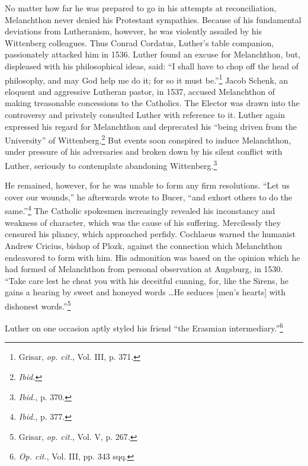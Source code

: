 No matter how far he was prepared to go in his attempts at reconciliation,
Melanchthon never denied his Protestant sympathies.
Because of his fundamental deviations from Lutheranism, however,
he was violently assailed by his Wittenberg colleagues. Thus Conrad
Cordatus, Luther’s table companion, passionately attacked him in
1536. Luther found an excuse for Melanchthon, but, displeased with
his philosophical ideas, said: “I shall have to chop off the head of philosophy,
and may God help me do it; for so it must be.”\footnote{Grisar, \textit{op. cit.}, Vol. III, p. 371.}
 Jacob
Schenk, an eloquent and aggressive Lutheran pastor, in 1537, accused
Melanchthon of making treasonable concessions to the Catholics. The
Elector was drawn into the controversy and privately consulted
Luther with reference to it. Luther again expressed his regard for
Melanchthon and deprecated his “being driven from the University”
of Wittenberg.\footnote{\textit{Ibid.}}
 But events soon conspired to induce Melanchthon,
under pressure of his adversaries and broken down by his silent conflict
with Luther, seriously to contemplate abandoning Wittenberg.\footnote{\textit{Ibid.}, p. 370.}

He remained, however, for he was unable to form any firm resolutions.
“Let us cover our wounds,” he afterwards wrote to Bucer, “and
exhort others to do the same.”\footnote{\textit{Ibid.}, p. 377.}
The Catholic spokesmen increasingly
revealed his inconstancy and weakness of character, which was the
cause of his suffering. Mercilessly they censured his pliancy, which
approached perfidy. Cochlaeus warned the humanist Andrew Cricius,
bishop of Plozk, against the connection which Melanchthon endeavored to
form with him. His admonition was based on the opinion
which he had formed of Melanchthon from personal observation at
Augsburg, in 1530. “Take care lest he cheat you with his deceitful
cunning, for, like the Sirens, he gains a hearing by sweet and honeyed
words \dots He seduces [men’s hearts] with dishonest words.”\footnote{Grisar, \textit{op. cit.}, Vol. V, p. 267.}

Luther on one occasion aptly styled his friend “the Erasmian intermediary.”\footnote{\textit{Op. cit.}, Vol. III, pp. 343 sqq.}

